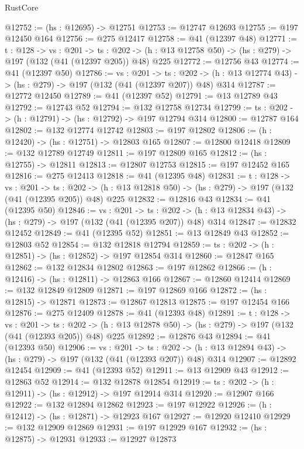 \begin{lexlean}{RustCore}
\begin{coremodule}
@12752 := (hs : @12695) -> @12751
@12753 := @12747 @12693
@12755 := @197 @12450 @164
@12756 := @275 @12417
@12758 := @41 (@12397 @48)
@12771 := {t : @128} ->
  {vs : @201} ->
  {ts : @202} -> (h : @13 @12758 @50) -> (hs : @279) -> @197 (@132 (@41 (@12397 @205)) @48) @225
@12772 := @12756 @43
@12774 := @41 (@12397 @50)
@12786 := {vs : @201} ->
  {ts : @202} -> (h : @13 @12774 @43) -> (hs : @279) -> @197 (@132 (@41 (@12397 @207)) @48) @314
@12787 := @12772 @12450
@12789 := @41 (@12397 @52)
@12791 := @13 @12789 @43
@12792 := @12743 @52
@12794 := @132 @12758 @12734
@12799 := {ts : @202} -> (h : @12791) -> (hs : @12792) -> @197 @12794 @314
@12800 := @12787 @164
@12802 := @132 @12774 @12742
@12803 := @197 @12802
@12806 := (h : @12420) -> (hs : @12751) -> @12803 @165
@12807 := @12800 @12418
@12809 := @132 @12789 @12749
@12811 := @197 @12809 @165
@12812 := (hs : @12755) -> @12811
@12813 := @12807 @12753
@12815 := @197 @12452 @165
@12816 := @275 @12413
@12818 := @41 (@12395 @48)
@12831 := {t : @128} ->
  {vs : @201} ->
  {ts : @202} -> (h : @13 @12818 @50) -> (hs : @279) -> @197 (@132 (@41 (@12395 @205)) @48) @225
@12832 := @12816 @43
@12834 := @41 (@12395 @50)
@12846 := {vs : @201} ->
  {ts : @202} -> (h : @13 @12834 @43) -> (hs : @279) -> @197 (@132 (@41 (@12395 @207)) @48) @314
@12847 := @12832 @12452
@12849 := @41 (@12395 @52)
@12851 := @13 @12849 @43
@12852 := @12803 @52
@12854 := @132 @12818 @12794
@12859 := {ts : @202} -> (h : @12851) -> (hs : @12852) -> @197 @12854 @314
@12860 := @12847 @165
@12862 := @132 @12834 @12802
@12863 := @197 @12862
@12866 := (h : @12416) -> (hs : @12811) -> @12863 @166
@12867 := @12860 @12414
@12869 := @132 @12849 @12809
@12871 := @197 @12869 @166
@12872 := (hs : @12815) -> @12871
@12873 := @12867 @12813
@12875 := @197 @12454 @166
@12876 := @275 @12409
@12878 := @41 (@12393 @48)
@12891 := {t : @128} ->
  {vs : @201} ->
  {ts : @202} -> (h : @13 @12878 @50) -> (hs : @279) -> @197 (@132 (@41 (@12393 @205)) @48) @225
@12892 := @12876 @43
@12894 := @41 (@12393 @50)
@12906 := {vs : @201} ->
  {ts : @202} -> (h : @13 @12894 @43) -> (hs : @279) -> @197 (@132 (@41 (@12393 @207)) @48) @314
@12907 := @12892 @12454
@12909 := @41 (@12393 @52)
@12911 := @13 @12909 @43
@12912 := @12863 @52
@12914 := @132 @12878 @12854
@12919 := {ts : @202} -> (h : @12911) -> (hs : @12912) -> @197 @12914 @314
@12920 := @12907 @166
@12922 := @132 @12894 @12862
@12923 := @197 @12922
@12926 := (h : @12412) -> (hs : @12871) -> @12923 @167
@12927 := @12920 @12410
@12929 := @132 @12909 @12869
@12931 := @197 @12929 @167
@12932 := (hs : @12875) -> @12931
@12933 := @12927 @12873

\end{coremodule}
\end{lexlean}
